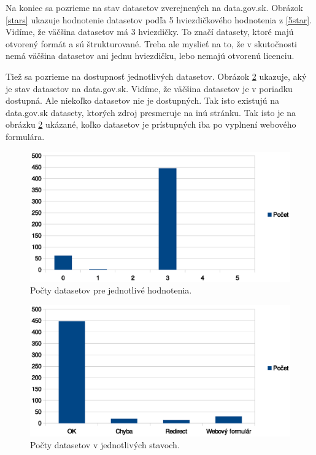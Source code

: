 \documentclass[12pt,a4paper]{article}
\begin{document}
Na koniec sa pozrieme na stav datasetov zverejnených na data.gov.sk. Obrázok \ref{stars} ukazuje hodnotenie datasetov podľa 5 hviezdičkového hodnotenia z \ref{5star}. Vidíme, že väčšina datasetov má 3 hviezdičky. To značí datasety, ktoré majú otvorený formát a sú štrukturované. Treba ale myslieť na to, že v skutočnosti nemá väčšina datasetov ani jednu hviezdičku, lebo nemajú otvorenú licenciu.

Tiež sa pozrieme na dostupnosť jednotlivých datasetov. Obrázok \ref{status} ukazuje, aký je stav datasetov na data.gov.sk. Vidíme, že väčšina datasetov je v poriadku dostupná. Ale niekoľko datasetov nie je dostupných. Tak isto existujú na data.gov.sk datasety, ktorých zdroj presmeruje na inú stránku. Tak isto je na obrázku \ref{status} ukázané, koľko datasetov je prístupných iba po vyplnení webového formulára.

\begin{figure}
\center \includegraphics[width=14cm]{stars}
\caption{Počty datasetov pre jednotlivé hodnotenia.}
\label{star}
\end{figure}

\begin{figure}
\center \includegraphics[width=14cm]{status}
\caption{Počty datasetov v jednotlivých stavoch.}
\label{status}
\end{figure}
\end{document}
